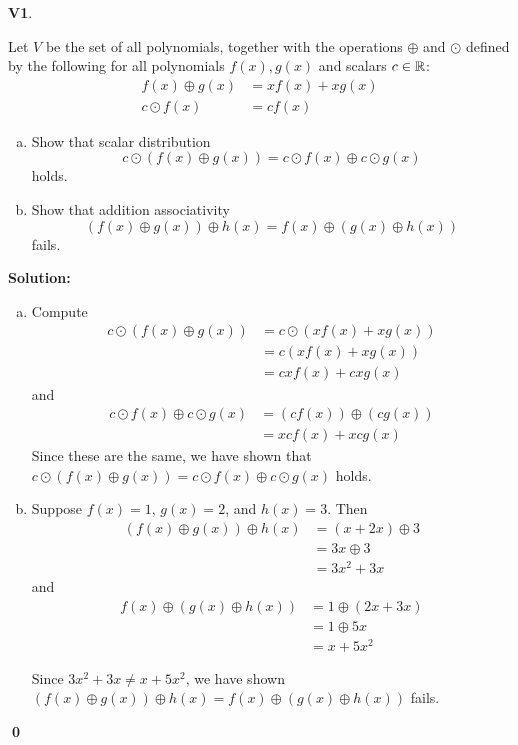 \documentclass{article}
\newenvironment{problem}[1]
{
	\begin{flushleft}
	\textbf{#1}.
	\ignorespaces
}
{
	\end{flushleft}
}
\newenvironment{solution}
{
	\ignorespaces
	\textbf{Solution:}
}
{
	\ignorespacesafterend
	\begin{flushright}
	{\bfseries \qed}
	\end{flushright}
}
\begin{document}
\begin{problem}{V1}
Let \(V\) be the set of all polynomials, together with the operations
\(\oplus\) and \(\odot\) defined by the following for all polynomials
\(f(x),g(x)\) and scalars \(c \in \mathbb{R}\):
\begin{align*}
f(x) \oplus g(x) &= xf(x)+xg(x) \\
c\odot f(x) &= cf(x)
\end{align*}
\begin{enumerate}[(a)]
\item Show that scalar distribution
\[c\odot \left(f(x)\oplus g(x) \right) = c \odot f(x) \oplus c \odot g(x)\]
holds.
\item Show that addition associativity
\[
	\left( f(x) \oplus g(x) \right) \oplus h(x)
=
	f(x) \oplus \left( g(x) \oplus h(x) \right)
\]
fails.
\end{enumerate}
\end{problem}
\begin{solution}
\begin{enumerate}[(a)]
\item
Compute
\begin{align*}
	c \odot \left(f(x) \oplus g(x) \right)
	&= c \odot \left(xf(x)+xg(x)\right) \\
	&= c\left(xf(x)+xg(x) \right) \\
	&= cxf(x)+cxg(x)
\end{align*}
and
\begin{align*}
	c\odot f(x) \oplus c \odot g(x)
	&= (cf(x)) \oplus (cg(x))\\
	&= xcf(x)+xcg(x)
\end{align*}
Since these are the same, we have shown that
\(c\odot \left(f(x)\oplus g(x) \right) = c \odot f(x) \oplus c \odot g(x)\)
holds.
\item
Suppose \(f(x)=1\), \(g(x)=2\), and \(h(x)=3\). Then
\begin{align*}
	\left( f(x) \oplus g(x) \right) \oplus h(x)
	&=\left(x+2x \right) \oplus 3\\
	&=3x \oplus 3\\
	&= 3x^2+3x
\end{align*}
and
\begin{align*}
	f(x) \oplus \left( g(x) \oplus h(x) \right)
	&=1 \oplus \left(2x+3x\right) \\
	&=1 \oplus 5x \\
	&=x + 5x^2
\end{align*}


Since \(3x^2+3x\not=x+5x^2\), we have shown
\(
	\left( f(x) \oplus g(x) \right) \oplus h(x)
=
	f(x) \oplus \left( g(x) \oplus h(x) \right)
\)
fails.
\end{enumerate}
\end{solution}
\end{document}
